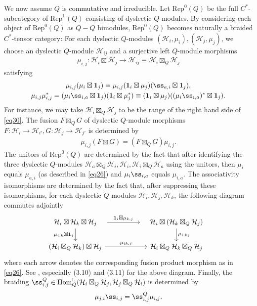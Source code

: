\documentclass[12pt,a4paper,notitlepage]{article}
\theoremstyle{definition}
\theoremstyle{plain}
\newcommand{\mc}{\mathcal}
\newcommand{\id}{\mathbf{1}}
\newcommand{\Rep}{\mathrm{Rep}}
\newcommand{\RepL}{\mathrm{Rep}^{\mathrm{L}}}
\newcommand{\HomL}{\mathrm{Hom}^{\mathrm{L}}}
\numberwithin{equation}{section}
\begin{document}
We now assume $Q$ is commutative and irreducible. Let $\Rep^0(Q)$ be the full $C^*$-subcategory of $\RepL(Q)$ consisting of  dyslectic $Q$-modules. By considering each object of $\Rep^0(Q)$ as $Q-Q$ bimodules, $\Rep^0(Q)$ becomes naturally a braided $C^*$-tensor category: For each dyslectic $Q$-modules $(\mc H_i,\mu_i),(\mc H_j,\mu_j)$, we choose an dyslectic $Q$-module $\mc H_{ij}$ and a surjective left $Q$-module morphisms 
\begin{align}
\mu_{i,j}: \mc H_i\boxtimes\mc H_j\rightarrow \mc H_{ij}\equiv\mc H_i\boxtimes_Q\mc H_j	\label{eq26}
\end{align}
satisfying 
\begin{gather}
\mu_{i,j}(\mu_i\boxtimes\id_j)=\mu_{i,j}(\id_i\boxtimes\mu_j)(\ss_{a,i}\boxtimes\id_j),\label{eq29}\\
\mu_{i,j}\mu_{i,j}^*=(\mu_i\ss_{i,a}\boxtimes\id_j)(\id_i\boxtimes\mu_j^*)\equiv(\id_i\boxtimes\mu_j)((\mu_i\ss_{i,a})^*\boxtimes\id_j).\label{eq30}
\end{gather}
For instance, we may  take $\mc H_i\boxtimes_Q\mc H_j$ to be the range of the right hand side of \eqref{eq30}. The fusion $F\boxtimes_Q G$ of dyslectic $Q$-module morphisms  $F:\mc H_i\rightarrow\mc H_{i'},G:\mc H_j\rightarrow\mc H_{j'}$ is determined by
\begin{align}
\mu_{i,j}(F\boxtimes G)=(F\boxtimes_Q G)\mu_{i,j}.	
\end{align}
The unitors of $\Rep^0(Q)$ are determined by the fact that after identifying the three dyslectic $Q$-modules $\mc H_a\boxtimes_Q \mc H_i,\mc H_i,\mc H_i\boxtimes_Q\mc H_a$ using the unitors, then $\mu_i$ equals $\mu_{a,i}$ (as described in \eqref{eq26}) and $\mu_i\ss_{i,a}$ equals $\mu_{i,a}$. The associativity isomorphisms are determined by the fact that, after suppressing these isomorphisms, for each dyslectic $Q$-modules $\mc H_i,\mc H_j,\mc H_k$, the following diagram commutes adjointly
\begin{equation}
	\begin{tikzcd}
		\quad \mc H_i\boxtimes\mc H_k\boxtimes\mc H_j\quad \arrow[rr,"{\id_i\boxtimes\mu_{k,j}}"] \arrow[d, "{\mu_{i,k}\boxtimes\id_j}"'] &&\quad \mc H_i\boxtimes(\mc H_k\boxtimes_Q\mc H_j)\quad \arrow[d, "{\mu_{i,kj}}"]\\
		(\mc H_i\boxtimes_Q\mc H_k)\boxtimes\mc H_j\arrow[rr,"{\mu_{ik,j}}"] &&\mc H_i\boxtimes_Q\mc H_k\boxtimes_Q\mc H_j
	\end{tikzcd}
\end{equation}
where each arrow denotes the corresponding fusion product morphism as in \eqref{eq26}. See \cite[Sec. 3.2, 3.4]{Gui19}, especially (3.10) and (3.11) for the above diagram. Finally, the braiding $\ss_{i,j}^Q\in\HomL_Q(\mc H_i\boxtimes_Q\mc H_j,\mc H_j\boxtimes_Q\mc H_i)$ is determined by
\begin{align}
\mu_{j,i}\ss_{i,j}=\ss^Q_{i,j}\mu_{i,j}.	
\end{align} 
\end{document}
